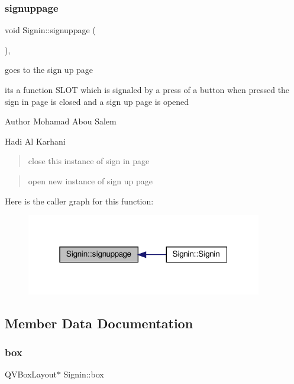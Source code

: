 \subsubsection{\texorpdfstring{signuppage}{signuppage}}
{\footnotesize\ttfamily void Signin\+::signuppage (\begin{DoxyParamCaption}{ }\end{DoxyParamCaption})\hspace{0.3cm}{\ttfamily [private]}, {\ttfamily [slot]}}



goes to the sign up page 

its a function S\+L\+OT which is signaled by a press of a button when pressed the sign in page is closed and a sign up page is opened

\begin{DoxyAuthor}{Author}
Mohamad Abou Salem 

Hadi Al Karhani 
\end{DoxyAuthor}
\begin{quote}
close this instance of sign in page \end{quote}


\begin{quote}
open new instance of sign up page \end{quote}
Here is the caller graph for this function\+:
\nopagebreak
\begin{figure}[H]
\begin{center}
\leavevmode
\includegraphics[width=292pt]{classSignin_af4276b4dc2cbbdba1f88746ad6d97dbd_icgraph}
\end{center}
\end{figure}


\subsection{Member Data Documentation}
\mbox{\label{classSignin_abc6d05488b0d134965c7dafbc049ac3b}} 
\subsubsection{\texorpdfstring{box}{box}}
{\footnotesize\ttfamily Q\+V\+Box\+Layout$\ast$ Signin\+::box}

